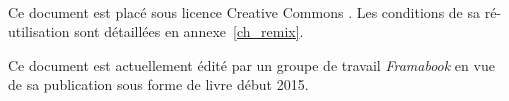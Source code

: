 \clearpage\thispagestyle{empty}



\vspace{-0.5cm}
{\center \normalsize \huge \ccLogo\ \ccAttribution\ \ccShareAlike \par}
\vspace{0.5cm}

Ce document est placé sous licence Creative Commons \myccbysa. Les conditions de sa ré-utilisation sont détaillées en annexe~\ref{ch_remix}.

\vspace{0.3cm}
\vspace{0.1cm}

Ce document est actuellement édité par un groupe de travail \textit{Framabook} en vue de sa publication sous forme de livre début 2015. 




\vspace{0.3cm}


\restoregeometry
